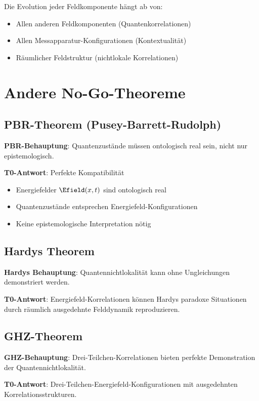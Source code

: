	Die Evolution jeder Feldkomponente hängt ab von:
	\begin{itemize}
		\item Allen anderen Feldkomponenten (Quantenkorrelationen)
		\item Allen Messapparatur-Konfigurationen (Kontextualität)
		\item Räumlicher Feldstruktur (nichtlokale Korrelationen)
	\end{itemize}
	
	\section{Andere No-Go-Theoreme}
	
	\subsection{PBR-Theorem (Pusey-Barrett-Rudolph)}
	
	\textbf{PBR-Behauptung}: Quantenzustände müssen ontologisch real sein, nicht nur epistemologisch.
	
	\textbf{T0-Antwort}: Perfekte Kompatibilität
	\begin{itemize}
		\item Energiefelder $\Efield(x,t)$ sind ontologisch real
		\item Quantenzustände entsprechen Energiefeld-Konfigurationen
		\item Keine epistemologische Interpretation nötig
	\end{itemize}
	
	\subsection{Hardys Theorem}
	
	\textbf{Hardys Behauptung}: Quantennichtlokalität kann ohne Ungleichungen demonstriert werden.
	
	\textbf{T0-Antwort}: Energiefeld-Korrelationen können Hardys paradoxe Situationen durch räumlich ausgedehnte Felddynamik reproduzieren.
	
	\subsection{GHZ-Theorem}
	
	\textbf{GHZ-Behauptung}: Drei-Teilchen-Korrelationen bieten perfekte Demonstration der Quantennichtlokalität.
	
	\textbf{T0-Antwort}: Drei-Teilchen-Energiefeld-Konfigurationen mit ausgedehnten Korrelationsstrukturen.
	
